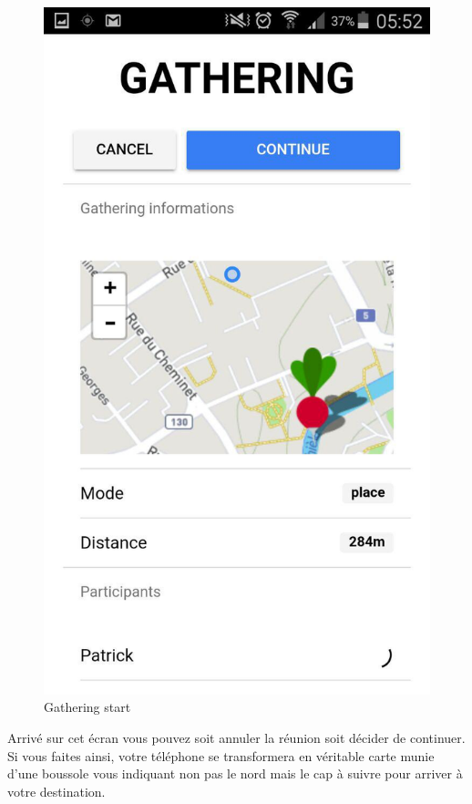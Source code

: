 \documentclass[french]{article}
\begin{document}
	\begin{figure}[H]
		\centering
		\includegraphics[scale=0.4]{../screenshot/screenshot-gathering-start}
		\caption{Gathering start}
		\label{Gathering start}
	\end{figure} 
	Arrivé sur cet écran vous pouvez soit annuler la réunion soit décider de continuer. Si vous faites ainsi, votre téléphone se transformera en véritable carte munie d'une boussole vous indiquant non pas le nord mais le cap à suivre pour arriver à votre destination.
\end{document}
